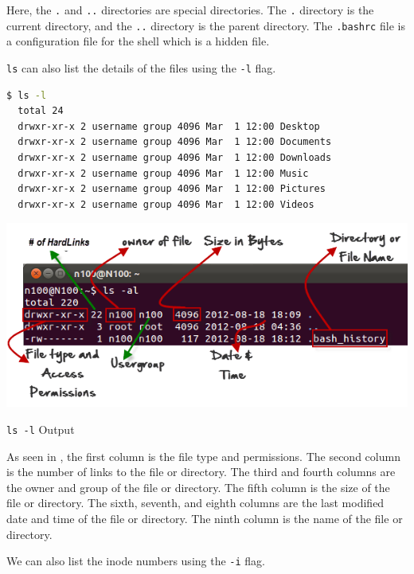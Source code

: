 Here, the \texttt{.} and \texttt{..} directories are special directories. The \texttt{.} directory is the current directory, and the \texttt{..} directory is the parent directory.
The \texttt{.bashrc} file is a configuration file for the shell which is a hidden file.

\texttt{ls} can also list the details of the files using the \texttt{-l} flag.

\begin{lstlisting}[language=bash]
  $ ls -l
  total 24
  drwxr-xr-x 2 username group 4096 Mar  1 12:00 Desktop
  drwxr-xr-x 2 username group 4096 Mar  1 12:00 Documents
  drwxr-xr-x 2 username group 4096 Mar  1 12:00 Downloads
  drwxr-xr-x 2 username group 4096 Mar  1 12:00 Music
  drwxr-xr-x 2 username group 4096 Mar  1 12:00 Pictures
  drwxr-xr-x 2 username group 4096 Mar  1 12:00 Videos
\end{lstlisting}

\begin{marginfigure}
	\includegraphics{images/png/ls-l.png}
	\caption[\texttt{ls -l} Output]{\texttt{ls -l} Output}
\end{marginfigure}

As seen in , the first column is the file type and permissions.
The second column is the number of links to the file or directory.
The third and fourth columns are the owner and group of the file or directory.
The fifth column is the size of the file or directory.
The sixth, seventh, and eighth columns are the last modified date and time of the file or directory.
The ninth column is the name of the file or directory.

We can also list the inode numbers
using the \texttt{-i} flag.

